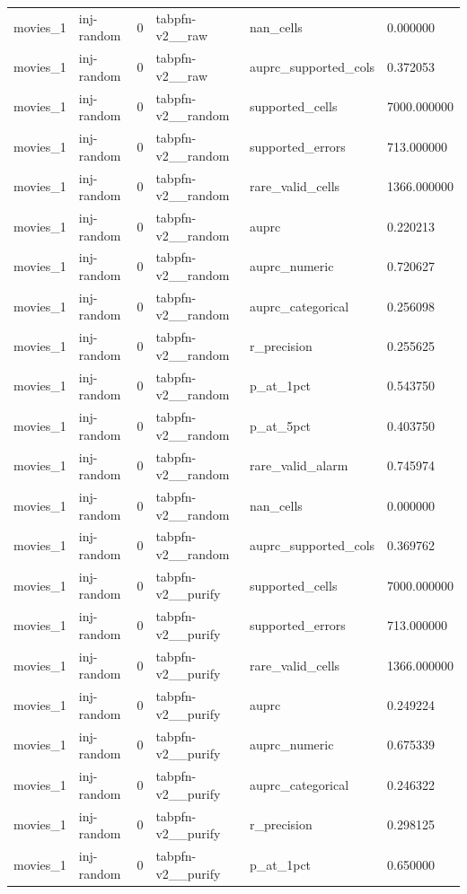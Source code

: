 \begin{tabular}{llllll}
movies\_1 & inj-random & 0 & tabpfn-v2\_\_raw & nan\_cells & 0.000000 \\
movies\_1 & inj-random & 0 & tabpfn-v2\_\_raw & auprc\_supported\_cols & 0.372053 \\
movies\_1 & inj-random & 0 & tabpfn-v2\_\_random & supported\_cells & 7000.000000 \\
movies\_1 & inj-random & 0 & tabpfn-v2\_\_random & supported\_errors & 713.000000 \\
movies\_1 & inj-random & 0 & tabpfn-v2\_\_random & rare\_valid\_cells & 1366.000000 \\
movies\_1 & inj-random & 0 & tabpfn-v2\_\_random & auprc & 0.220213 \\
movies\_1 & inj-random & 0 & tabpfn-v2\_\_random & auprc\_numeric & 0.720627 \\
movies\_1 & inj-random & 0 & tabpfn-v2\_\_random & auprc\_categorical & 0.256098 \\
movies\_1 & inj-random & 0 & tabpfn-v2\_\_random & r\_precision & 0.255625 \\
movies\_1 & inj-random & 0 & tabpfn-v2\_\_random & p\_at\_1pct & 0.543750 \\
movies\_1 & inj-random & 0 & tabpfn-v2\_\_random & p\_at\_5pct & 0.403750 \\
movies\_1 & inj-random & 0 & tabpfn-v2\_\_random & rare\_valid\_alarm & 0.745974 \\
movies\_1 & inj-random & 0 & tabpfn-v2\_\_random & nan\_cells & 0.000000 \\
movies\_1 & inj-random & 0 & tabpfn-v2\_\_random & auprc\_supported\_cols & 0.369762 \\
movies\_1 & inj-random & 0 & tabpfn-v2\_\_purify & supported\_cells & 7000.000000 \\
movies\_1 & inj-random & 0 & tabpfn-v2\_\_purify & supported\_errors & 713.000000 \\
movies\_1 & inj-random & 0 & tabpfn-v2\_\_purify & rare\_valid\_cells & 1366.000000 \\
movies\_1 & inj-random & 0 & tabpfn-v2\_\_purify & auprc & 0.249224 \\
movies\_1 & inj-random & 0 & tabpfn-v2\_\_purify & auprc\_numeric & 0.675339 \\
movies\_1 & inj-random & 0 & tabpfn-v2\_\_purify & auprc\_categorical & 0.246322 \\
movies\_1 & inj-random & 0 & tabpfn-v2\_\_purify & r\_precision & 0.298125 \\
movies\_1 & inj-random & 0 & tabpfn-v2\_\_purify & p\_at\_1pct & 0.650000 \\

\end{tabular}
